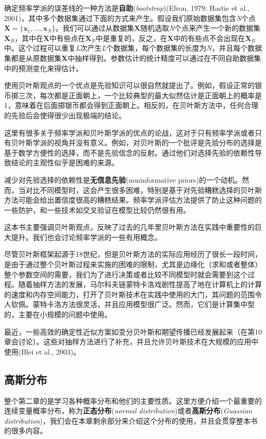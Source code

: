 	 确定频率学派的误差线的一种方法是\textbf{自助}(\textit{bootstrap})(Efron, 1979; Hastie et al., 2001)，其中多个数据集通过下面的方式来产生。假设我们原始数据集包含\textit{N}个点$\textbf{X} = \{ \textbf{x}_1, \dots, \textbf{x}_N \}$。我们可以通过从数据集\textbf{X}随机选取\textit{N}个点来产生一个新的数据集$\textbf{X}_B$，其中在$\textbf{X}$中有些点在$\textbf{X}_B$中是重复的，反之，在$\textbf{X}$中的有些点不会出现在$\textbf{X}_B$中。这个过程可以重复\textit{L}次产生\textit{L}个数据集，每个数据集的长度为\textit{N}，并且每个数据集都是从原数据集\textbf{X}中抽样得到。参数估计的统计精度可以通过在不同自助数据集中的预测变化来得估计。
	 
	 使用贝叶斯观点的一个优点是先验知识可以很自然就提出了。例如，假设正常的银币掷三次，每次都是正面朝上，一个比较典型的最大似然估计是正面朝上的概率是1，意味着在后面掷银币都会得到正面朝上。相反的，在贝叶斯方法中，任何合理的先验后会使得很少出现极端的结论。
	 
	 这里有很多关于频率学派和贝叶斯学派的优点的论战，这对于只有频率学派或者只有贝叶斯学派的视角并没有意义。例如，对贝叶斯的一个批评是先验分布的选择是基于数学方便性的选择，而不是先验信念的反射。通过他们对选择先验的依赖性导致结论的主观性似乎是困难的来源。
	 
	 减少对先验选择的依赖性是\textbf{无信息先验}(noninformative priors)的一个动机。然而，当对比不同模型时，这会产生很多困难，特别是基于对先验糟糕选择的贝叶斯方法可能会给出置信度很高的糟糕结果。频率学派评估方法提供了防止这种问题的一些防护，和一些技术如交叉验证在模型比较仍然很有用。
	 
	 这本书主要强调贝叶斯观点，反映了过去的几年里贝叶斯方法在实践中重要性的巨大提升。我们也会讨论频率学派的一些有用概念。
	 
	 尽管贝叶斯框架起源于18世纪，但是贝叶斯方法的实际应用经历了很长一段时间，是由于通过整个贝叶斯过程来实施的困难的限制，尤其是边缘化（求和或者整体）整个参数空间的需要，我们为了进行决策或者比较不同模型时就会需要到这个过程。随着抽样方法的发展，马尔科夫链蒙特卡洛戏剧性提高了地在计算机上的计算的速度和内存空间能力，打开了贝叶斯技术在实践中使用的大门，其问题的范围令人钦佩。蒙特卡洛方法很灵活，并且应用模型很广泛。然而，它们是计算集中型的，主要在小规模的问题中使用。
	 
	 最近，一些高效的确定性近似方案如变分贝叶斯和期望传播已经发展起来（在第10章会讨论）。这些对抽样方法进行了补充，并且允许贝叶斯技术在大规模的应用中使用(Blei et al., 2003)。
	 
\subsection{高斯分布}
	 整个第二章的是学习各种概率分布和他们的主要性质。这里方便介绍一个最重要的连续变量概率分布，称为\textbf{正态分布}(\textit{normal distribution})或者\textbf{高斯分布}(\textit{Guassian distribution})，我们会在本章剩余部分来介绍这个分布的使用，并且会贯穿整本书的很多内容。
	 
